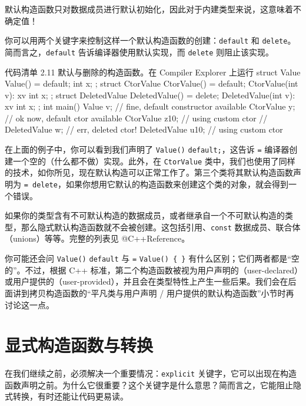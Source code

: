 \begin{myWarnBox}
默认构造函数只对数据成员进行默认初始化，因此对于内建类型来说，这意味着不确定值！
\end{myWarnBox}


你可以用两个关键字来控制这样一个默认构造函数的创建：\texttt{default} 和 \texttt{delete}。简而言之，\texttt{default} 告诉编译器使用默认实现，而 \texttt{delete} 则阻止该实现。

\begin{codeboxt}[cpp]{代码清单 2.11 默认与删除的构造函数。在 Compiler Explorer 上运行}
struct Value {
Value() = default;
int x;
};
struct CtorValue {
CtorValue() = default;
CtorValue(int v): x{v} { }
int x;
};
struct DeletedValue {
DeletedValue() = delete;
DeletedValue(int v): x{v} { }
int x;
};
int main() {
Value v;
// fine, default constructor available
CtorValue y;
// ok now, default ctor available
CtorValue z{10}; // using custom ctor
// DeletedValue w;
// err, deleted ctor!
DeletedValue u{10}; // using custom ctor
}
\end{codeboxt}

在上面的例子中，你可以看到我们声明了 \texttt{Value()} \texttt{default;}，这告诉 \texttt{=} 编译器创建一个空的（什么都不做）实现。此外，在 \texttt{CtorValue} 类中，我们也使用了同样的技术，如你所见，现在默认构造可以正常工作了。第三个类将其默认构造函数声明为 \texttt{= delete}，如果你想用它默认的构造函数来创建这个类的对象，就会得到一个错误。

如果你的类型含有不可默认构造的数据成员，或者继承自一个不可默认构造的类型，那么隐式默认构造函数就不会被创建。这包括引用、\texttt{const} 数据成员、联合体（unions）等等。完整的列表见 @C++Reference。

\begin{myInfoBox}
你可能还会问 \texttt{Value()} \texttt{default} 与 \texttt{=} \texttt{Value() \{ \}} 有什么区别；它们两者都是“空的”。不过，根据 C++ 标准，第二个构造函数被视为用户声明的（user-declared）或用户提供的（user-provided），并且会在类型特性上产生一些后果。我们会在后面讲到拷贝构造函数的“平凡类与用户声明 / 用户提供的默认构造函数”小节时再讨论这一点。
\end{myInfoBox}

\section{显式构造函数与转换}

在我们继续之前，必须解决一个重要情况：\texttt{explicit} 关键字，它可以出现在构造函数声明之前。为什么它很重要？这个关键字是什么意思？简而言之，它能阻止隐式转换，有时还能让代码更易读。

